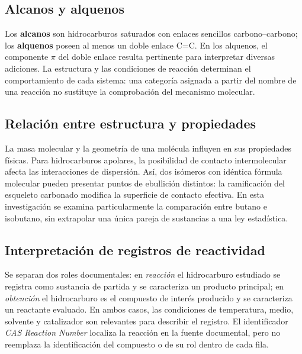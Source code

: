 \subsection{Alcanos y alquenos}
Los \textbf{alcanos} son hidrocarburos saturados con enlaces sencillos carbono--carbono; los \textbf{alquenos} poseen al menos un doble enlace C=C. En los alquenos, el componente $\pi$ del doble enlace resulta pertinente para interpretar diversas adiciones. La estructura y las condiciones de reacción determinan el comportamiento de cada sistema: una categoría asignada a partir del nombre de una reacción no sustituye la comprobación del mecanismo molecular.

\subsection{Relación entre estructura y propiedades}
La masa molecular y la geometría de una molécula influyen en sus propiedades físicas. Para hidrocarburos apolares, la posibilidad de contacto intermolecular afecta las interacciones de dispersión. Así, dos isómeros con idéntica fórmula molecular pueden presentar puntos de ebullición distintos: la ramificación del esqueleto carbonado modifica la superficie de contacto efectiva. En esta investigación se examina particularmente la comparación entre butano e isobutano, sin extrapolar una única pareja de sustancias a una ley estadística.

\subsection{Interpretación de registros de reactividad}
Se separan dos roles documentales: en \emph{reacción} el hidrocarburo estudiado se registra como sustancia de partida y se caracteriza un producto principal; en \emph{obtención} el hidrocarburo es el compuesto de interés producido y se caracteriza un reactante evaluado. En ambos casos, las condiciones de temperatura, medio, solvente y catalizador son relevantes para describir el registro. El identificador \emph{CAS Reaction Number} localiza la reacción en la fuente documental, pero no reemplaza la identificación del compuesto o de su rol dentro de cada fila.
